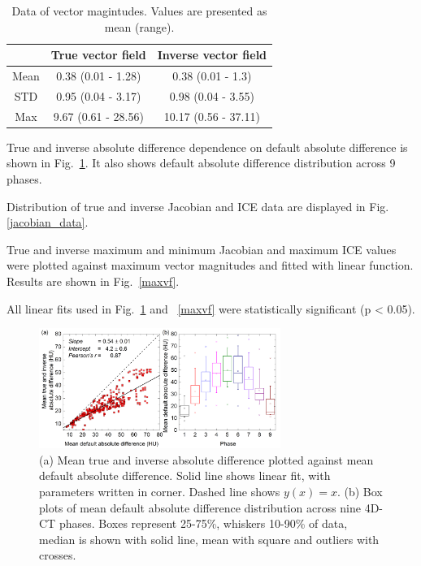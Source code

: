 \begin{table}[H]
  \centering
  \caption{Data of vector magintudes. Values are presented as mean (range).}
  \begin{tabular}{c|c|c}
  
       & True vector field & Inverse vector field  \\
       \hline
       Mean & 0.38 (0.01 - 1.28) & 0.38 (0.01 - 1.3) \\ 
       STD & 0.95 (0.04 - 3.17) & 0.98 (0.04 - 3.55) \\ 
       Max & 9.67 (0.61 - 28.56) & 10.17 (0.56 - 37.11) \\
    \hline\hline
  \end{tabular}
  \label{tab:vectordata_lung}
\end{table}

True and inverse absolute difference dependence on default absolute difference is shown in Fig.~\ref{absDiff_lung}. It also shows default absolute difference distribution across 9 phases. 

Distribution of true and inverse Jacobian and ICE data are displayed in Fig. \ref{jacobian_data}. 

True and inverse maximum and minimum Jacobian and maximum ICE values were plotted against maximum vector magnitudes and fitted with linear function. Results are shown in Fig.~\ref{maxvf}.

All linear fits used in Fig.~\ref{absDiff_lung} and ~\ref{maxvf} were statistically significant (p < 0.05).


\begin{figure}[H]
	\begin{center}		
		\includegraphics[width=0.7\textwidth]{./VisualMotionManagment/Images/absDiff.png}
		\caption{(a) Mean true and inverse absolute difference plotted against mean default absolute difference. Solid line shows linear fit, with parameters
		written in corner. Dashed line shows $y(x)=x$. (b) Box plots of mean default absolute difference distribution across nine 4D-CT phases. Boxes represent 25-75\%, whiskers 10-90\%
		of data, median is shown with solid line, mean with square and outliers with crosses.}
		\label{absDiff_lung}
	\end{center}
\end{figure}

